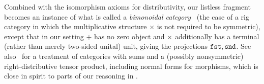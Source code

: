 Combined with the isomorphism axioms for distributivity, our listless fragment becomes an instance of what is called a \emph{bimonoidal category}~\cite{Laplaza1972a,Laplaza1972b,Kelly1974} (the case of a rig category in which the multiplicative structure $\times$ is not required to be symmetric), except that in our setting $+$ has no zero object and $\times$ additionally has a terminal (rather than merely two-sided unital) unit, giving the projections $\mathtt{fst},\mathtt{snd}$. See also~\cite{Labella2003} for a treatment of categories with sums and a (possibly nonsymmetric) right-distributive tensor product, including normal forms for morphisms, which is close in spirit to parts of our reasoning in .

